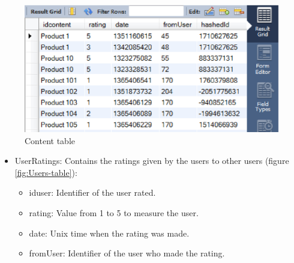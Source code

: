 \documentclass[a4paper,10pt]{article}
\begin{document}
\begin{center}
\begin{figure}
\begin{centering}
\includegraphics[scale=0.6]{content.eps}
\par\end{centering}
\caption{Content table\label{fig:Content-table}}
\end{figure}

\par\end{center}
\begin{itemize}


\item UserRatings: Contains the ratings given by the users to other users
(figure \ref{fig:Users-table}):

\begin{itemize}
\item iduser: Identifier of the user rated.
\item rating: Value from 1 to 5 to measure the user.
\item date: Unix time when the rating was made.
\item fromUser: Identifier of the user who made the rating.
\end{itemize}
\end{itemize}
\end{document}
